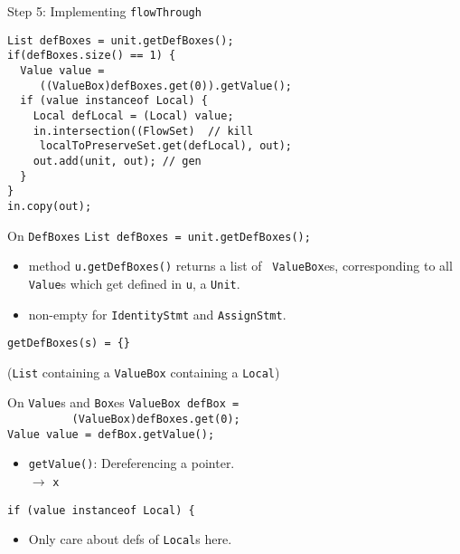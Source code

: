 \begin{slide}{Step 5: Implementing {\tt flowThrough}}
\vspace*{-0.15in}
{\small
\begin{verbatim}
List defBoxes = unit.getDefBoxes();
if(defBoxes.size() == 1) {
  Value value = 
     ((ValueBox)defBoxes.get(0)).getValue();
  if (value instanceof Local) {
    Local defLocal = (Local) value;    
    in.intersection((FlowSet)  // kill
     localToPreserveSet.get(defLocal), out);
    out.add(unit, out); // gen
  }
}
in.copy(out);
\end{verbatim}}
\end{slide}

\begin{slide}{On {\tt DefBoxes}}
\vspace*{-0.1in}
{\tt List defBoxes = unit.getDefBoxes();}

\vspace*{-0.05in}
\begin{itemize}
\item method {\green \tt u.getDefBoxes()} returns a list of {\tt
ValueBox}es, corresponding to all {\tt Value}s which get defined
in {\tt u}, a {\tt Unit}. 

\item non-empty for {\tt IdentityStmt} and {\tt AssignStmt}.
\end{itemize}

\vspace*{-0.08in}
\begin{center}
\end{center}

\vspace*{0.05in}
{\tt getDefBoxes(s) = \{\}}\\
\qquad \qquad \begin{minipage}{0.7\textwidth} 
({\tt List} containing a {\tt ValueBox} containing a {\tt Local})
\end{minipage}

\end{slide}

\begin{slide}{On {\tt Value}s and {\tt Box}es}
\verb+ValueBox defBox = +\\
\verb+          (ValueBox)defBoxes.get(0);+\\
{\green \verb+Value value = defBox.getValue();+}

\begin{itemize}
\item {\tt getValue()}: Dereferencing a pointer.\\
\qquad \qquad \qquad \qquad {} $\rightarrow$ {\tt x}
\end{itemize}

\verb+if (value instanceof Local) {+

\begin{itemize}
\item Only care about defs of {\tt Local}s here.
\end{itemize}
\end{slide}

